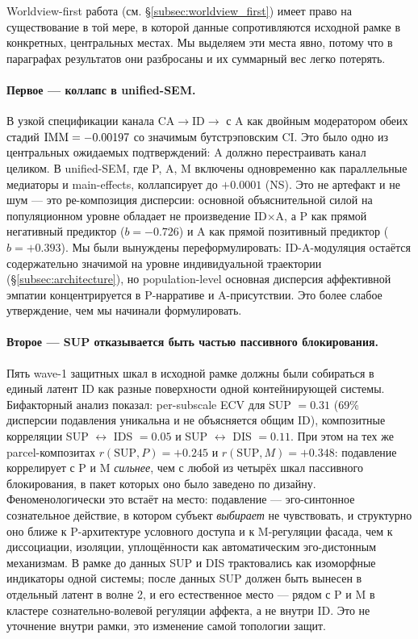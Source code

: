 Worldview-first работа (см. §\ref{subsec:worldview_first}) имеет право на существование в той мере, в которой данные сопротивляются исходной рамке в конкретных, центральных местах. Мы выделяем эти места явно, потому что в параграфах результатов они разбросаны и их суммарный вес легко потерять.

\paragraph{Первое --- коллапс \IMM{} в unified-SEM.} В узкой спецификации канала CA$\to$ID$\to$\EAF{} с A как двойным модератором обеих стадий $\mathrm{IMM} = -0.00197$ со значимым бутстрэповским CI. Это было одно из центральных ожидаемых подтверждений: A должно перестраивать канал целиком. В unified-SEM, где P, A, M включены одновременно как параллельные медиаторы и main-effects, \IMM{} коллапсирует до $+0.0001$ (NS). Это не артефакт и не шум --- это ре-композиция дисперсии: основной объяснительной силой \EAF{} на популяционном уровне обладает не произведение ID$\times$A, а P как прямой негативный предиктор ($b = -0.726$) и A как прямой позитивный предиктор ($b = +0.393$). Мы были вынуждены переформулировать: ID-A-модуляция остаётся содержательно значимой на уровне индивидуальной траектории (§\ref{subsec:architecture}), но population-level основная дисперсия аффективной эмпатии концентрируется в P-нарративе и A-присутствии. Это более слабое утверждение, чем мы начинали формулировать.

\paragraph{Второе --- SUP отказывается быть частью пассивного блокирования.} Пять wave-1 защитных шкал в исходной рамке должны были собираться в единый латент ID как разные поверхности одной контейнирующей системы. Бифакторный анализ показал: per-subscale ECV для SUP $= 0.31$ (69\% дисперсии подавления уникальна и не объясняется общим ID), композитные корреляции SUP $\leftrightarrow$ IDS $= 0.05$ и SUP $\leftrightarrow$ DIS $= 0.11$. При этом на тех же parcel-композитах $r(\mathrm{SUP}, P) = +0.245$ и $r(\mathrm{SUP}, M) = +0.348$: подавление коррелирует с P и M \emph{сильнее}, чем с любой из четырёх шкал пассивного блокирования, в пакет которых оно было заведено по дизайну. Феноменологически это встаёт на место: подавление --- эго-синтонное сознательное действие, в котором субъект \emph{выбирает} не чувствовать, и структурно оно ближе к P-архитектуре условного доступа и к M-регуляции фасада, чем к диссоциации, изоляции, уплощённости как автоматическим эго-дистонным механизмам. В рамке до данных SUP и DIS трактовались как изоморфные индикаторы одной системы; после данных SUP должен быть вынесен в отдельный латент в волне 2, и его естественное место --- рядом с P и M в кластере сознательно-волевой регуляции аффекта, а не внутри ID. Это не уточнение внутри рамки, это изменение самой топологии защит.

